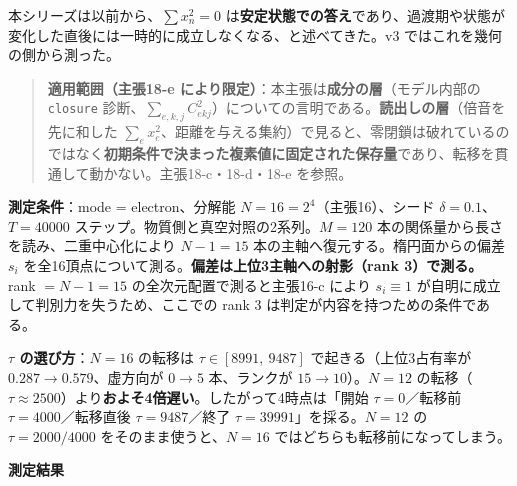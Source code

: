 \documentclass[
  10pt,
]{ltjsarticle}
\begin{document}
本シリーズは以前から、\(\sum x_n^2 = 0\)
は\textbf{安定状態での答え}であり、過渡期や状態が変化した直後には一時的に成立しなくなる、と述べてきた。v3
ではこれを幾何の側から測った。

\begin{quote}
\textbf{適用範囲（主張18-e
により限定）}：本主張は\textbf{成分の層}（モデル内部の \texttt{closure}
診断、\(\sum_{e,k,j}C_{ekj}^2\)）についての言明である。\textbf{読出しの層}（倍音を先に和した
\(\sum_e x_e^2\)、距離を与える集約）で見ると、零閉鎖は破れているのではなく\textbf{初期条件で決まった複素値に固定された保存量}であり、転移を貫通して動かない。主張18-c・18-d・18-e
を参照。
\end{quote}

\textbf{測定条件}：mode = electron、分解能
\(N = 16 = 2^4\)（主張16）、シード \(\delta = 0.1\)、\(T = 40000\)
ステップ。物質側と真空対照の2系列。\(M = 120\)
本の関係量から長さを読み、二重中心化により \(N-1 = 15\)
本の主軸へ復元する。楕円面からの偏差 \(s_i\)
を全16頂点について測る。\textbf{偏差は上位3主軸への射影（rank
3）で測る。} rank \(= N-1 = 15\) の全次元配置で測ると主張16-c により
\(s_i \equiv 1\) が自明に成立して判別力を失うため、ここでの rank 3
は判定が内容を持つための条件である。

\textbf{\(\tau\) の選び方}：\(N=16\) の転移は \(\tau \in [8991,\ 9487]\)
で起きる（上位3占有率が \(0.287 \to 0.579\)、虚方向が \(0 \to 5\)
本、ランクが \(15 \to 10\)）。\(N=12\)
の転移（\(\tau \approx 2500\)）より\textbf{およそ4倍遅い}。したがって4時点は「開始
\(\tau=0\)／転移前 \(\tau=4000\)／転移直後 \(\tau=9487\)／終了
\(\tau=39991\)」を採る。\(N=12\) の \(\tau=2000/4000\)
をそのまま使うと、\(N=16\) ではどちらも転移前になってしまう。

\textbf{測定結果}
\end{document}
